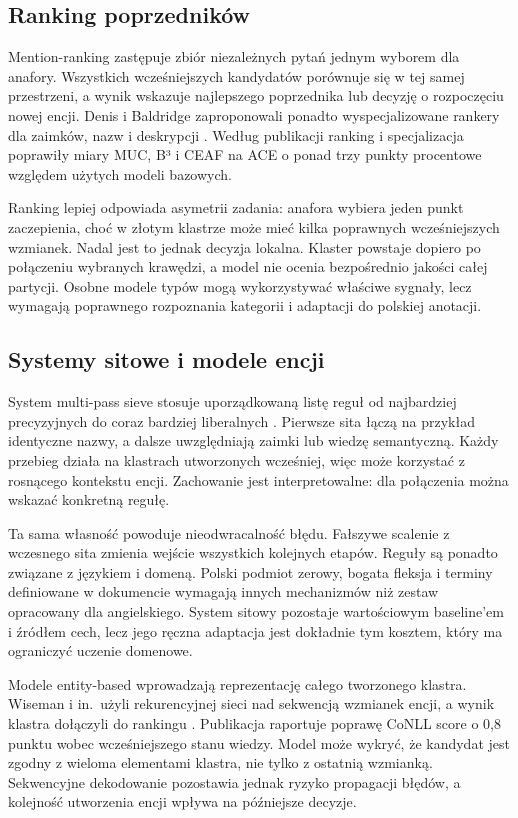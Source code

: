 \subsection{Ranking poprzedników}

Mention-ranking zastępuje zbiór niezależnych pytań jednym wyborem dla anafory. Wszystkich wcześniejszych kandydatów porównuje się w tej samej przestrzeni, a wynik wskazuje najlepszego poprzednika lub decyzję o rozpoczęciu nowej encji. Denis i Baldridge zaproponowali ponadto wyspecjalizowane rankery dla zaimków, nazw i deskrypcji \cite{denis_2008_specialized}. Według publikacji ranking i specjalizacja poprawiły miary MUC, B³ i CEAF na ACE o ponad trzy punkty procentowe względem użytych modeli bazowych.

Ranking lepiej odpowiada asymetrii zadania: anafora wybiera jeden punkt zaczepienia, choć w złotym klastrze może mieć kilka poprawnych wcześniejszych wzmianek. Nadal jest to jednak decyzja lokalna. Klaster powstaje dopiero po połączeniu wybranych krawędzi, a model nie ocenia bezpośrednio jakości całej partycji. Osobne modele typów mogą wykorzystywać właściwe sygnały, lecz wymagają poprawnego rozpoznania kategorii i adaptacji do polskiej anotacji.

\subsection{Systemy sitowe i modele encji}

System multi-pass sieve stosuje uporządkowaną listę reguł od najbardziej precyzyjnych do coraz bardziej liberalnych \cite{raghunathan_2010_sieve}. Pierwsze sita łączą na przykład identyczne nazwy, a dalsze uwzględniają zaimki lub wiedzę semantyczną. Każdy przebieg działa na klastrach utworzonych wcześniej, więc może korzystać z rosnącego kontekstu encji. Zachowanie jest interpretowalne: dla połączenia można wskazać konkretną regułę.

Ta sama własność powoduje nieodwracalność błędu. Fałszywe scalenie z wczesnego sita zmienia wejście wszystkich kolejnych etapów. Reguły są ponadto związane z językiem i domeną. Polski podmiot zerowy, bogata fleksja i terminy definiowane w dokumencie wymagają innych mechanizmów niż zestaw opracowany dla angielskiego. System sitowy pozostaje wartościowym baseline'em i źródłem cech, lecz jego ręczna adaptacja jest dokładnie tym kosztem, który ma ograniczyć uczenie domenowe.

Modele entity-based wprowadzają reprezentację całego tworzonego klastra. Wiseman i in.\ użyli rekurencyjnej sieci nad sekwencją wzmianek encji, a wynik klastra dołączyli do rankingu \cite{wiseman_2016_global}. Publikacja raportuje poprawę CoNLL score o 0,8 punktu wobec wcześniejszego stanu wiedzy. Model może wykryć, że kandydat jest zgodny z wieloma elementami klastra, nie tylko z ostatnią wzmianką. Sekwencyjne dekodowanie pozostawia jednak ryzyko propagacji błędów, a kolejność utworzenia encji wpływa na późniejsze decyzje.

